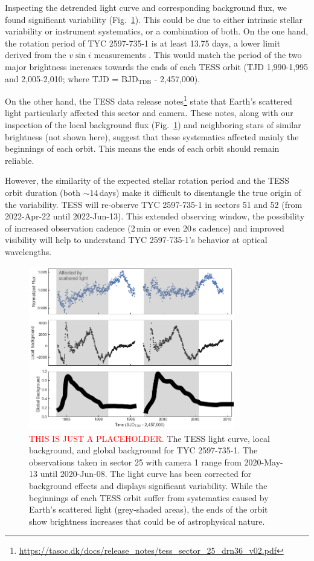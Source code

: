 \documentclass[linenumbers]{aastex631}
\begin{document}
Inspecting the detrended light curve and corresponding background flux, we found significant variability (Fig.~\ref{fig:TESS_light_curve}).
This could be due to either intrinsic stellar variability or instrument systematics, or a combination of both.
On the one hand, the rotation period of TYC 2597-735-1 is at least 13.75 days, a lower limit derived from the $v \sin{i}$ measurements \cite{???}. This would match the period of the two major brightness increases towards the ends of each TESS orbit (TJD 1,990-1,995 and 2,005-2,010; where TJD = $\mathrm{BJD_{TDB}}$ - 2,457,000).

On the other hand, the TESS data release notes\footnote{\url{https://tasoc.dk/docs/release_notes/tess_sector_25_drn36_v02.pdf}} state that Earth's scattered light particularly affected this sector and camera. These notes, along with our inspection of the local background flux (Fig.~\ref{fig:TESS_light_curve}) and neighboring stars of similar brightness (not shown here), suggest that these systematics affected mainly the beginnings of each orbit. This means the ends of each orbit should remain reliable.

However, the similarity of the expected stellar rotation period and the TESS orbit duration (both $\sim14$\,days) make it difficult to disentangle the true origin of the variability. TESS will re-observe TYC 2597-735-1 in sectors 51 and 52 (from 2022-Apr-22 until 2022-Jun-13). This extended observing window, the possibility of increased observation cadence (2\,min or even 20\,s cadence) and improved visibility will help to understand TYC 2597-735-1's behavior at optical wavelengths.

\begin{figure}
    \centering
    \includegraphics[width=0.8\textwidth]{figures/TESS_light_curve.png}
    \caption{\textcolor{red}{THIS IS JUST A PLACEHOLDER.} The TESS light curve, local background, and global background for TYC 2597-735-1. The observations taken in sector 25 with camera 1 range from 2020-May-13 until 2020-Jun-08. The light curve has been corrected for background effects and displays significant variability. While the beginnings of each TESS orbit suffer from systematics caused by Earth's scattered light (grey-shaded areas), the ends of the orbit show brightness increases that could be of astrophysical nature.
    \label{fig:TESS_light_curve}}
\end{figure}
\end{document}
